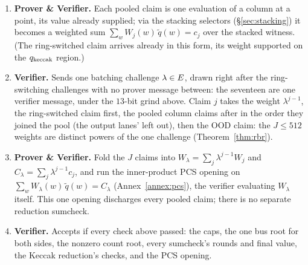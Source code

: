 \begin{enumerate}
\item \textbf{Prover \& Verifier.} Each pooled claim is one evaluation of a column at a point, its value already supplied; via the stacking selectors (\S\ref{sec:stacking}) it becomes a weighted sum $\sum_w W_j(w)\,\widetilde q(w)=c_j$ over the stacked witness. (The ring-switched claim arrives already in this form, its weight supported on the $q_{\mathrm{keccak}}$ region.)
\item \textbf{Verifier.} Sends one batching challenge $\lambda\in E$, drawn right after the ring-switching challenges with no prover message between: the seventeen are one verifier message, under the $13$-bit grind above. Claim $j$ takes the weight $\lambda^{j-1}$, the ring-switched claim first, the pooled column claims after in the order they joined the pool (the output lanes' left out), then the OOD claim: the $J\le512$ weights are distinct powers of the one challenge (Theorem~\ref{thm:rbr}).
\item \textbf{Prover \& Verifier.} Fold the $J$ claims into $W_\lambda=\sum_j\lambda^{j-1} W_j$ and $C_\lambda=\sum_j\lambda^{j-1} c_j$, and run the inner-product PCS opening on $\sum_w W_\lambda(w)\,\widetilde q(w)=C_\lambda$ (Annex~\ref{annex:pcs}), the verifier evaluating $W_\lambda$ itself. This one opening discharges every pooled claim; there is no separate reduction sumcheck.
\item \textbf{Verifier.} Accepts if every check above passed: the caps, the one bus root for both sides, the nonzero count root, every sumcheck's rounds and final value, the Keccak reduction's checks, and the PCS opening.
\end{enumerate}
